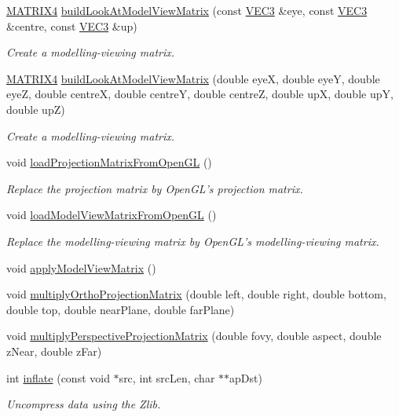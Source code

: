 \begin{DoxyCompactItemize}
\hyperlink{class_math_1_1_matrix4x4}{MATRIX4} \hyperlink{namespace_utilities_a84ad75173a3da5e4e8b355d03d100c59}{buildLookAtModelViewMatrix} (const \hyperlink{class_math_1_1_vec3}{VEC3} \&eye, const \hyperlink{class_math_1_1_vec3}{VEC3} \&centre, const \hyperlink{class_math_1_1_vec3}{VEC3} \&up)
\begin{DoxyCompactList}\small\item\em Create a modelling-\/viewing matrix. \end{DoxyCompactList}\item 
\hyperlink{class_math_1_1_matrix4x4}{MATRIX4} \hyperlink{namespace_utilities_a0dfa7bb57b5c491451a43d8b4d7dd983}{buildLookAtModelViewMatrix} (double eyeX, double eyeY, double eyeZ, double centreX, double centreY, double centreZ, double upX, double upY, double upZ)
\begin{DoxyCompactList}\small\item\em Create a modelling-\/viewing matrix. \end{DoxyCompactList}\item 
void \hyperlink{namespace_utilities_a1787b9d17f79b46cd3fc546bfd9ee196}{loadProjectionMatrixFromOpenGL} ()
\begin{DoxyCompactList}\small\item\em Replace the projection matrix by OpenGL's projection matrix. \end{DoxyCompactList}\item 
void \hyperlink{namespace_utilities_a8cc5454fb226411756900e06f3b121b2}{loadModelViewMatrixFromOpenGL} ()
\begin{DoxyCompactList}\small\item\em Replace the modelling-\/viewing matrix by OpenGL's modelling-\/viewing matrix. \end{DoxyCompactList}\item 
void \hyperlink{namespace_utilities_a3fdfd69b196f894ae78f35a055d8683e}{applyModelViewMatrix} ()
\item 
void \hyperlink{namespace_utilities_ab6a11c99ddae551a4d7bc64d18d63046}{multiplyOrthoProjectionMatrix} (double left, double right, double bottom, double top, double nearPlane, double farPlane)
\item 
void \hyperlink{namespace_utilities_aaf402e609cb9931c8534ac08968fb49b}{multiplyPerspectiveProjectionMatrix} (double fovy, double aspect, double zNear, double zFar)
\item 
int \hyperlink{namespace_utilities_aaa3b1ecb143bfae45b704d5a35bd8269}{inflate} (const void $\ast$src, int srcLen, char $\ast$$\ast$apDst)
\begin{DoxyCompactList}\small\item\em Uncompress data using the Zlib. \end{DoxyCompactList}\end{DoxyCompactItemize}
